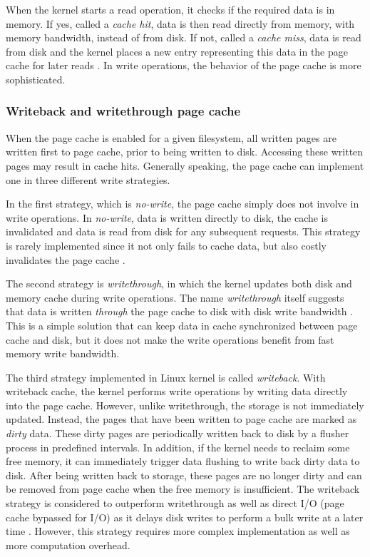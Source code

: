 When the kernel starts a read operation, it checks if the required data is 
in memory. If yes, called a \textit{cache hit}, data is then read directly 
from memory, with memory bandwidth, instead of from disk. 
If not, called a \textit{cache miss}, data is read from disk and the kernel 
places a new entry representing this data in the page cache for later reads 
\cite{linuxdev3rd2010}. 
In write operations, the behavior of the page cache is more sophisticated.

\subsubsection{Writeback and writethrough page cache}

When the page cache is enabled for a given filesystem, all written pages 
are written first to page cache, prior to being written to disk.
Accessing these written pages may result in cache hits.
Generally speaking, the page cache can implement one in three 
different write strategies.

In the first strategy, which is \textit{no-write}, the page cache simply 
does not involve in write operations. In \textit{no-write}, data is written 
directly to disk, the cache is invalidated and data is read from disk for any 
subsequent requests. 
This strategy is rarely implemented since it not only fails to cache data, 
but also costly invalidates the page cache \cite{linuxdev3rd2010}.

The second strategy is \textit{writethrough}, in which the kernel updates both 
disk and memory cache during write operations. The name \textit{writethrough} 
itself suggests that data is written \textit{through} the page cache to disk 
with disk write bandwidth \cite{linuxdev3rd2010}.
This is a simple solution that can keep data in cache synchronized 
between page cache and disk, but it does not make the write operations 
benefit from fast memory write bandwidth. 

The third strategy implemented in Linux kernel is called \textit{writeback}. 
With writeback cache, the kernel performs write operations by writing data 
directly into the page cache. However, unlike writethrough, the storage is not 
immediately updated. Instead, the pages that have been written to page cache 
are marked as \textit{dirty} data. These dirty pages are periodically written 
back to disk by a flusher process in predefined intervals. 
In addition, if the kernel needs to reclaim some free memory, it can 
immediately trigger data flushing to write back dirty data to disk. 
After being written back to storage, these pages are no longer dirty 
and can be removed from page cache when the free memory is insufficient.
The writeback strategy is considered to outperform writethrough as well as
direct I/O (page cache bypassed for I/O) as it delays disk writes to perform 
a bulk write at a later time \cite{linuxdev3rd2010}. 
However, this strategy requires more complex implementation as well as  
more computation overhead. 

